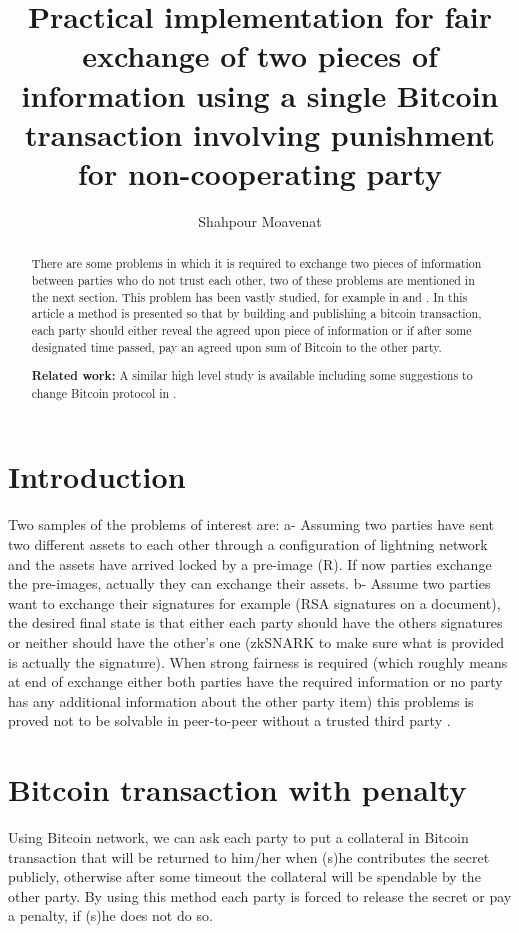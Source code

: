 \documentclass[]{article}
\title{Practical implementation for fair exchange of two pieces of information using a single Bitcoin transaction involving punishment for non-cooperating party}
\author{Shahpour Moavenat}
\begin{document}
\maketitle

\begin{abstract}
There are some problems in which it is required to exchange two pieces of information between parties who do not trust each other, two of these problems are mentioned in the next section. This problem has been vastly studied, for example in \cite{ray2002} and \cite{asokan99}. In this article a method is presented so that by building and publishing a bitcoin transaction, each party should either reveal the agreed upon piece of information or if after some designated time passed, pay an agreed upon sum of Bitcoin to the other party.

\textbf{Related work:} A similar high level study is available including some suggestions to change Bitcoin protocol in \cite{andrychowicz}.
\end{abstract}

\section{Introduction}
Two samples of the problems of interest are: a- Assuming two parties have sent two different assets to each other through a configuration of lightning network \cite{lightning} and the assets have arrived locked by a pre-image (R). If now parties exchange the pre-images, actually they can exchange their assets. b- Assume two parties want to exchange their signatures for example (RSA signatures on a document), the desired final state is that either each party should have the others signatures or neither should have the other's one (zkSNARK to make sure what is provided is actually the signature). When strong fairness is required (which roughly means at end of exchange either both parties have the required information or no party has any additional information about the other party item) this problems is proved not to be solvable in peer-to-peer without a trusted third party \cite{impossible}.

\section{Bitcoin transaction with penalty}
Using Bitcoin network, we can ask each party to put a collateral in Bitcoin transaction that will be returned to him/her when (s)he contributes the secret publicly, otherwise after some timeout the collateral will be spendable by the other party. By using this method each party is forced to release the secret or pay a penalty, if (s)he does not do so.
\end{document}
